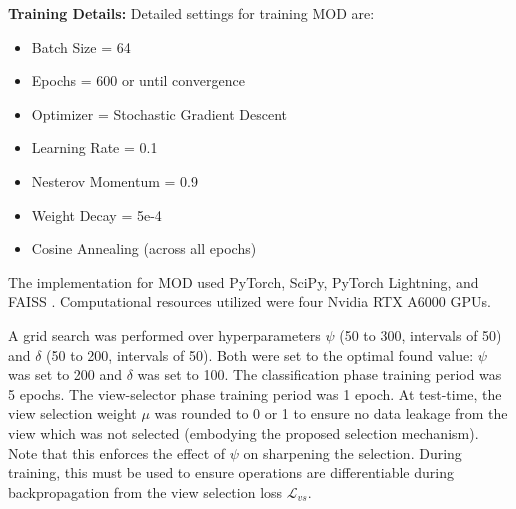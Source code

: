 \textbf{Training Details:} Detailed settings for training MOD are:
\begin{itemize}
    \item Batch Size = 64
    \item Epochs = 600 or until convergence
    \item Optimizer = Stochastic Gradient Descent
    \item Learning Rate = 0.1
    \item Nesterov Momentum = 0.9
    \item Weight Decay = 5e-4
    \item Cosine Annealing (across all epochs)
\end{itemize}
The implementation for MOD used PyTorch, SciPy, PyTorch Lightning, and FAISS \cite{johnson2019billion}. Computational resources utilized were four Nvidia RTX A6000 GPUs.

A grid search was performed over hyperparameters $\psi$ (50 to 300, intervals of 50) and $\delta$ (50 to 200, intervals of 50). Both were set to the optimal found value: $\psi$ was set to 200 and $\delta$ was set to 100. The classification phase training period was 5 epochs. The view-selector phase training period was 1 epoch. At test-time, the view selection weight $\mu$ was rounded to 0 or 1 to ensure no data leakage from the view which was not selected (embodying the proposed selection mechanism). Note that this enforces the effect of $\psi$ on sharpening the selection. During training, this must be used to ensure operations are differentiable during backpropagation from the view selection loss $\mathcal{L}_{vs}$.

